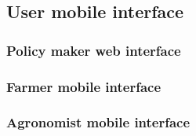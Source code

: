 \subsection{User mobile interface}
\label{sec:user_mobile_interface}



\subsubsection{Policy maker web interface}
\label{sec:pm_web_interface}



\subsubsection{Farmer mobile interface}
\label{sec:farmer_mob_interface}



\subsubsection{Agronomist mobile interface}
\label{sec:agronomist_mob_interface}



